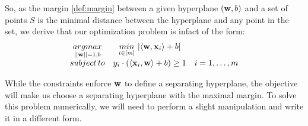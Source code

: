 So, as the margin \ref{def:margin} between a given hyperplane $\left(\mathbf{w},b\right)$ and a set of points $S$ is the minimal distance between the hyperplane and any point in the set, we derive that our optimization problem is infact of the form:
\begin{equation}
	\begin{array}{ccc}
		\underset{\left|\left| \mathbf{w}\right|\right|=1,b}{argmax} & \underset{i\in\left[m\right]}{min}\,\left|\left\langle \mathbf{w},\mathbf{x}_i\right\rangle+b\right| & \\
		subject \, to & y_i \cdot \left( \left\langle \mathbf{x}_i,\mathbf{w}\right\rangle+b \right) \geq 1 & i=1,\ldots,m\\
	\end{array}
	\label{eqn:hard_svm_opt2}
\end{equation}

While the constraints enforce $\mathbf{w}$ to define a separating hyperplane, the objective will make us choose a separating hyperplane with the maximal margin. To solve this problem numerically, we will need to perform a slight manipulation and write it in a different form.


